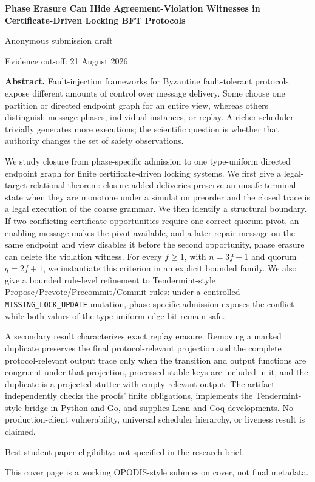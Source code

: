 \documentclass[10pt,a4paper]{article}
\begin{document}
\begin{titlepage}
\centering
\vspace*{22mm}
{\LARGE\bfseries Phase Erasure Can Hide Agreement-Violation Witnesses in
Certificate-Driven Locking BFT Protocols\par}
\vspace{14mm}
{\large Anonymous submission draft\par}
\vspace{8mm}
{\small Evidence cut-off: 21 August 2026\par}
\vfill
\begin{minipage}{0.88\textwidth}
\textbf{Abstract.}
Fault-injection frameworks for Byzantine fault-tolerant protocols expose
different amounts of control over message delivery. Some choose one
partition or directed endpoint graph for an entire view, whereas others
distinguish message phases, individual instances, or replay. A richer
scheduler trivially generates more executions; the scientific question
is whether that authority changes the set of safety observations.

We study closure from phase-specific admission to one type-uniform
directed endpoint graph for finite certificate-driven locking systems.
We first give a legal-target relational theorem: closure-added
deliveries preserve an unsafe terminal state when they are monotone
under a simulation preorder and the closed trace is a legal execution of
the coarse grammar. We then identify a structural boundary. If two
conflicting certificate opportunities require one correct quorum pivot,
an enabling message makes the pivot available, and a later repair
message on the same endpoint and view disables it before the second
opportunity, phase erasure can delete the violation witness. For every
\(f\geq1\), with \(n=3f+1\) and quorum \(q=2f+1\), we instantiate this
criterion in an explicit bounded family. We also give a bounded
rule-level refinement to Tendermint-style
Propose/Prevote/Precommit/Commit rules: under a controlled
\texttt{MISSING\_LOCK\_UPDATE} mutation, phase-specific admission
exposes the conflict while both values of the type-uniform edge bit
remain safe.

A secondary result characterizes exact replay erasure. Removing a marked
duplicate preserves the final protocol-relevant projection and the
complete protocol-relevant output trace only when the transition and
output functions are congruent under that projection, processed stable
keys are included in it, and the duplicate is a projected stutter with
empty relevant output. The artifact independently checks the proofs'
finite obligations, implements the Tendermint-style bridge in Python and
Go, and supplies Lean and Coq developments. No production-client
vulnerability, universal scheduler hierarchy, or liveness result is
claimed.
\end{minipage}
\vfill
{\small Best student paper eligibility: not specified in the research brief.\par}
{\small This cover page is a working OPODIS-style submission cover, not final metadata.\par}
\end{titlepage}
\end{document}
